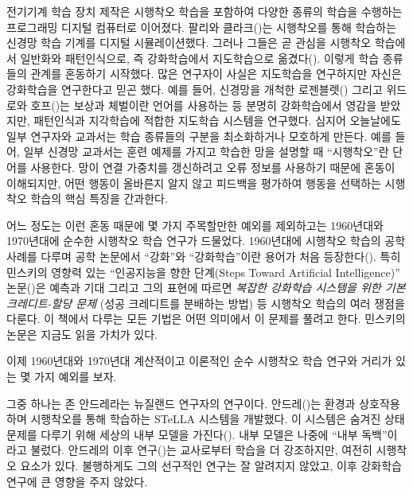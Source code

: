 전기기계 학습 장치 제작은 시행착오 학습을 포함하여 다양한 종류의 학습을 수행하는
프로그래밍 디지털 컴퓨터로 이어졌다. 팔리와 클라크(\cite{FarleyClark1954})는
시행착오를 통해 학습하는 신경망 학습 기계를 디지털 시뮬레이션했다. 그러나 그들은
곧 관심을 시행착오 학습에서 일반화와 패턴인식으로, 즉 강화학습에서 지도학습으로
옮겼다(\cite{ClarkFarley1955}). 이렇게 학습 종류들의 관계를 혼동하기 시작했다.
많은 연구자이 사실은 지도학습을 연구하지만 자신은 강화학습을 연구한다고 믿곤
했다. 예를 들어, 신경망을 개척한 로젠블렛(\cite{Rosenblatt1962}) 그리고 위드로와
호프(\cite{WidrowHoff1960})는 보상과 체벌이란 언어를 사용하는 등 분명히
강화학습에서 영감을 받았지만, 패턴인식과 지각학습에 적합한 지도학습 시스템을
연구했다. 심지어 오늘날에도 일부 연구자와 교과서는 학습 종류들의 구분을
최소화하거나 모호하게 만든다. 예를 들어, 일부 신경망 교과서는 훈련 예제를 가지고
학습한 망을 설명할 때 ``시행착오''란 단어를 사용한다. 망이 연결 가중치를
갱신하려고 오류 정보를 사용하기 때문에 혼동이 이해되지만, 어떤 행동이 올바른지
알지 않고 피드백을 평가하여 행동을 선택하는 시행착오 학습의 핵심 특징을
간과한다.

어느 정도는 이런 혼동 때문에 몇 가지 주목할만한 예외를 제외하고는 1960년대와
1970년대에 순수한 시행착오 학습 연구가 드물었다. 1960년대에 시행착오 학습의
공학 사례를 다루며 공학 논문에서 ``강화''와 ``강화학습''이란 용어가 처음
등장한다(\cite[예,][]{WaltzFu1965, Mendel1966, Fu1970, MendelMcLaren1970}). 특히
민스키의 영향력 있는 ``인공지능을 향한 단계(Steps Toward Artificial
Intelligence)'' 논문(\cite{Minsky1961})은 예측과 기대 그리고 그의 표현에 따르면
\emph{복잡한 강화학습 시스템을 위한 기본 크레디트-할당 문제} (성공 크레디트를
분배하는 방법) 등 시행착오 학습의 여러 쟁점을 다룬다. 이 책에서 다루는 모든
기법은 어떤 의미에서 이 문제를 풀려고 한다. 민스키의 논문은 지금도 읽을 가치가
있다.


이제 1960년대와 1970년대 계산적이고 이론적인 순수 시행착오 학습 연구와 거리가
있는 몇 가지 예외를 보자.

그중 하나는 존 안드레라는 뉴질랜드 연구자의 연구이다.
안드레(\cite{Andreae1963})는 환경과 상호작용하며 시행착오를 통해 학습하는 STeLLA
시스템을 개발했다. 이 시스템은 숨겨진 상태 문제를 다루기 위해 세상의 내부 모델을
가진다(\cite{Andreae1969a}). 내부 모델은 나중에 ``내부 독백''이라고 불렀다.
안드레의 이후 연구(\cite*{Andreae1977})는 교사로부터 학습을 더 강조하지만,
여전히 시행착오 요소가 있다. 불행하게도 그의 선구적인 연구는 잘 알려지지 않았고,
이후 강화학습 연구에 큰 영향을 주지 않았다.

